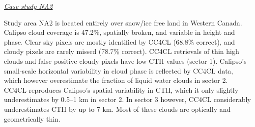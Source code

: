 \vspace{5mm}\underline{\textit{Case study NA2}}\vspace{2mm}

Study area NA2 is located entirely over snow/ice free land in Western Canada. Calipso cloud coverage is 47.2\%, spatially broken, and variable in height and phase. Clear sky pixels are mostly identified by CC4CL (68.8\% correct), and cloudy pixels are rarely missed (78.7\% correct). CC4CL retrievals of thin high clouds and false positive cloudy pixels have low CTH values (sector 1). Calipso's small-scale horizontal variability in cloud phase is reflected by CC4CL data, which however overestimate the fraction of liquid water clouds in sector 2. CC4CL reproduces Calipso's spatial variability in CTH, which it only slightly underestimates by 0.5--1 km in sector 2. In sector 3 however, CC4CL considerably underestimates CTH by up to 7 km. Most of these clouds are optically and geometrically thin.




